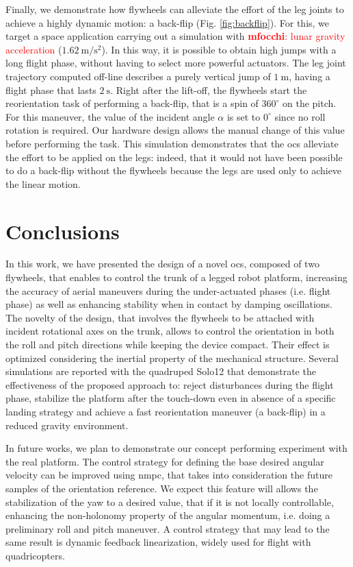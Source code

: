 \documentclass[sensors,article,submit,pdftex,moreauthors]{Definitions/mdpi}
\newcommand{\MF}[1]{\textcolor{red}{\textbf{mfocchi}: #1}}
\begin{document}
Finally, we demonstrate how flywheels can alleviate the effort of the leg joints to achieve a highly dynamic motion: a back-flip (Fig. \ref{fig:backflip}). 
For this, we target a space application carrying out a simulation with \MF{lunar gravity acceleration} ($1.62 \ \mathrm{m/s^2}$).
In this way, it is possible to obtain high jumps with a long flight phase, without having to select more powerful actuators.  
The leg joint trajectory computed off-line describes a purely vertical jump of $1 \ \mathrm{m}$, having a flight phase that lasts $2 \ \mathrm{s}$.
Right after the lift-off, the flywheels start the reorientation task of performing a back-flip, that is a spin of $360^\circ$ on the pitch.
For this maneuver, the value of the incident angle $\alpha$ is set to $0^\circ$ since no roll rotation is required.
Our hardware design allows the manual change of this value before performing the task.
This simulation demonstrates that the \gls{ocs} alleviate the effort to be applied on the legs: indeed, that it would not have been possible to do a back-flip without the flywheels because the legs are used only to achieve the linear motion. 



\section{Conclusions}
\label{sec:conclusions}

In this work, we have presented the design of a novel \gls{ocs}, composed of two flywheels, that enables to control the trunk of a legged robot platform, 
increasing the accuracy of aerial maneuvers during the under-actuated phases (i.e. flight phase) as well as 
enhancing stability when in contact by damping oscillations.
The novelty of the design, that involves the flywheels to be attached with incident rotational axes on the trunk, allows to control the orientation
in both the roll and pitch directions while keeping the device compact. Their effect is optimized considering the inertial property of the mechanical structure. 
Several simulations are reported with the quadruped Solo12 that demonstrate the effectiveness of the proposed approach to: 
reject disturbances during the flight phase, stabilize the platform after the touch-down even in absence of a specific landing strategy and 
achieve a fast reorientation maneuver (a back-flip) in a reduced gravity environment. 

In future works, we plan to demonstrate our concept performing experiment with the real platform. The control strategy for defining the base desired angular velocity can be improved using \gls{nmpc}, that takes into consideration the future samples of the orientation reference.
We expect this feature will allows the stabilization of the yaw to a desired value, that if it is not locally controllable, enhancing the non-holonomy property of the angular momentum, i.e. doing a preliminary roll and pitch maneuver. 
A control strategy that may lead to the same result is dynamic feedback linearization, widely used for flight with quadricopters.
\end{document}
